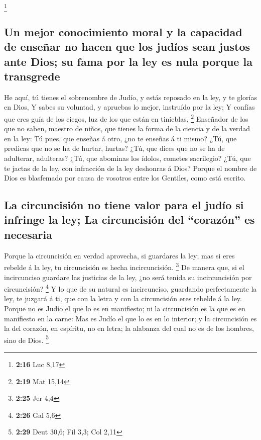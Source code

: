 \footnote{\textbf{2:16} Luc 8,17}

\hypertarget{un-mejor-conocimiento-moral-y-la-capacidad-de-enseuxf1ar-no-hacen-que-los-juduxedos-sean-justos-ante-dios-su-fama-por-la-ley-es-nula-porque-la-transgrede}{%
\subsection{Un mejor conocimiento moral y la capacidad de enseñar no
hacen que los judíos sean justos ante Dios; su fama por la ley es nula
porque la
transgrede}\label{un-mejor-conocimiento-moral-y-la-capacidad-de-enseuxf1ar-no-hacen-que-los-juduxedos-sean-justos-ante-dios-su-fama-por-la-ley-es-nula-porque-la-transgrede}}

 He aquí, tú tienes el sobrenombre de Judío, y estás
reposado en la ley, y te glorías en Dios,  Y sabes su
voluntad, y apruebas lo mejor, instruído por la ley;  Y
confías que eres guía de los ciegos, luz de los que están en tinieblas,
\footnote{\textbf{2:19} Mat 15,14}  Enseñador de los que
no saben, maestro de niños, que tienes la forma de la ciencia y de la
verdad en la ley:  Tú pues, que enseñas á otro, ¿no te
enseñas á ti mismo? ¿Tú, que predicas que no se ha de hurtar, hurtas?
 ¿Tú, que dices que no se ha de adulterar, adulteras?
¿Tú, que abominas los ídolos, cometes sacrilegio?  ¿Tú,
que te jactas de la ley, con infracción de la ley deshonras á Dios?
 Porque el nombre de Dios es blasfemado por causa de
vosotros entre los Gentiles, como está escrito.

\hypertarget{la-circuncisiuxf3n-no-tiene-valor-para-el-juduxedo-si-infringe-la-ley-la-circuncisiuxf3n-del-corazuxf3n-es-necesaria}{%
\subsection{La circuncisión no tiene valor para el judío si infringe la
ley; La circuncisión del ``corazón'' es
necesaria}\label{la-circuncisiuxf3n-no-tiene-valor-para-el-juduxedo-si-infringe-la-ley-la-circuncisiuxf3n-del-corazuxf3n-es-necesaria}}

 Porque la circuncisión en verdad aprovecha, si guardares
la ley; mas si eres rebelde á la ley, tu circuncisión es hecha
incircuncisión. \footnote{\textbf{2:25} Jer 4,4}  De
manera que, si el incircunciso guardare las justicias de la ley, ¿no
será tenida su incircuncisión por circuncisión? \footnote{\textbf{2:26}
  Gal 5,6}  Y lo que de su natural es incircunciso,
guardando perfectamente la ley, te juzgará á ti, que con la letra y con
la circuncisión eres rebelde á la ley.  Porque no es
Judío el que lo es en manifiesto; ni la circuncisión es la que es en
manifiesto en la carne:  Mas es Judío el que lo es en lo
interior; y la circuncisión es la del corazón, en espíritu, no en letra;
la alabanza del cual no es de los hombres, sino de Dios. \footnote{\textbf{2:29}
  Deut 30,6; Fil 3,3; Col 2,11}

